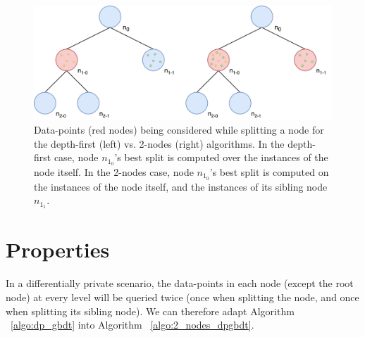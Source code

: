\begin{figure}[h!]
	\center
	\includegraphics[scale=0.66]{images/dpgbdt/2-nodes.png}
	\caption{\label{fig:tree_2-nodes} Data-points (red nodes) being considered while splitting a node for the depth-first (left) vs. 2-nodes (right) algorithms. In the depth-first case, node $n_{1_0}$'s best split is computed over the instances of the node itself. In the 2-nodes case, node $n_{1_0}$'s best split is computed on the instances of the node itself, and the instances of its sibling node $n_{1_1}$.}
\end{figure}

\section{Properties}

In a differentially private scenario, the data-points in each node (except the root node) at every level will be queried twice (once when splitting the node, and once when splitting its sibling node). We can therefore adapt Algorithm ~\ref{algo:dp_gbdt} into Algorithm ~\ref{algo:2_nodes_dpgbdt}.

